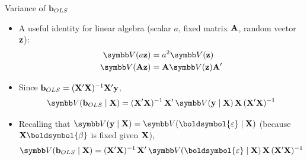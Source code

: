 \documentclass[aspectratio=169,11pt]{beamer}
\begin{document}
\begin{frame}{Variance of ${\bf b}_{OLS}$}
\begin{itemize}
	\item A useful identity for linear algebra (scalar $a$, fixed matrix ${\bf A}$, random vector ${\bf z}$):
\begin{align*}
\Var (a {\bf z} ) &= a^2 \Var({\bf z})\\
\Var ({\bf A} {\bf z} ) &= {\bf A}  \Var({\bf z}) {\bf A}'
\end{align*}

\smallskip
\item Since ${\bf b}_{OLS} = ({\bf X}' {\bf X} )^{-1} {\bf X}' {\bf y}$,
\begin{align*}
\Var ({\bf b}_{OLS} \mid  {\bf X}) = ({\bf X}' {\bf X} )^{-1} \, {\bf X}' \, \Var ({\bf y} \mid {\bf X}) \,  {\bf X} \, ({\bf X}'{\bf X} )^{-1}
\end{align*}

\smallskip
\item Recalling that $\Var ( {\bf y} \mid {\bf X} )  = \Var ( \boldsymbol{\varepsilon}  \mid {\bf X}  ) $ (because ${\bf X}\boldsymbol{\beta}$ is fixed given ${\bf X}$),
\begin{align*}
\Var( {\bf b}_{OLS} \mid {\bf X}) = ({\bf X}'{\bf X})^{-1}\, {\bf X}'\, \Var ( \boldsymbol{\varepsilon} \mid {\bf X} ) \, {\bf X} \, ({\bf X}'{\bf X})^{-1}
\end{align*}
\end{itemize}
\end{frame}
\end{document}
